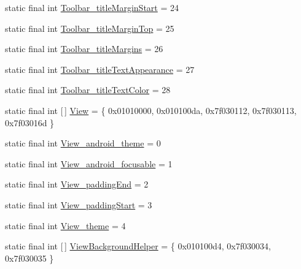 \begin{DoxyCompactItemize}
static final int \mbox{\hyperlink{classandroid_1_1support_1_1v7_1_1appcompat_1_1R_1_1styleable_a7c416ae3b5c0071a240e5f8135f2c12f}{Toolbar\+\_\+title\+Margin\+Start}} = 24
\item 
static final int \mbox{\hyperlink{classandroid_1_1support_1_1v7_1_1appcompat_1_1R_1_1styleable_aa4a73cce7755d27d8dd9266d6b2af22e}{Toolbar\+\_\+title\+Margin\+Top}} = 25
\item 
static final int \mbox{\hyperlink{classandroid_1_1support_1_1v7_1_1appcompat_1_1R_1_1styleable_a12bc46ef3a7e84c54f1605a360569247}{Toolbar\+\_\+title\+Margins}} = 26
\item 
static final int \mbox{\hyperlink{classandroid_1_1support_1_1v7_1_1appcompat_1_1R_1_1styleable_a0cb9adf45f180ac45768a0740adde323}{Toolbar\+\_\+title\+Text\+Appearance}} = 27
\item 
static final int \mbox{\hyperlink{classandroid_1_1support_1_1v7_1_1appcompat_1_1R_1_1styleable_ae4d6d3b0232dc582346e59fe0075c161}{Toolbar\+\_\+title\+Text\+Color}} = 28
\item 
static final int \mbox{[}$\,$\mbox{]} \mbox{\hyperlink{classandroid_1_1support_1_1v7_1_1appcompat_1_1R_1_1styleable_a0105bc03f2606ae1fc5f05a515d81b3c}{View}} = \{ 0x01010000, 0x010100da, 0x7f030112, 0x7f030113, 0x7f03016d \}
\item 
static final int \mbox{\hyperlink{classandroid_1_1support_1_1v7_1_1appcompat_1_1R_1_1styleable_a97295033e07fbae4ddf3760f36497583}{View\+\_\+android\+\_\+theme}} = 0
\item 
static final int \mbox{\hyperlink{classandroid_1_1support_1_1v7_1_1appcompat_1_1R_1_1styleable_a312f53078ad7e72668c30818eb36f4d5}{View\+\_\+android\+\_\+focusable}} = 1
\item 
static final int \mbox{\hyperlink{classandroid_1_1support_1_1v7_1_1appcompat_1_1R_1_1styleable_ab97189cfc89b78ea06021e2de56df41b}{View\+\_\+padding\+End}} = 2
\item 
static final int \mbox{\hyperlink{classandroid_1_1support_1_1v7_1_1appcompat_1_1R_1_1styleable_ac503580e2e9b985ce96f033596ac9a31}{View\+\_\+padding\+Start}} = 3
\item 
static final int \mbox{\hyperlink{classandroid_1_1support_1_1v7_1_1appcompat_1_1R_1_1styleable_a6ff12e56eb22350fa07942cc5e70ab5a}{View\+\_\+theme}} = 4
\item 
static final int \mbox{[}$\,$\mbox{]} \mbox{\hyperlink{classandroid_1_1support_1_1v7_1_1appcompat_1_1R_1_1styleable_a41b23c720259f27b563271bda1b5767a}{View\+Background\+Helper}} = \{ 0x010100d4, 0x7f030034, 0x7f030035 \}

\end{DoxyCompactItemize}
